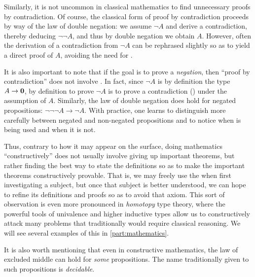 Similarly, it is not uncommon in classical mathematics to find unnecessary proofs by contradiction.
%
Of course, the classical form of proof by contradiction proceeds by way of the law of double negation: we assume $\neg A$ and derive a contradiction, thereby deducing $\neg \neg A$, and thus by double negation we obtain $A$.
However, often the derivation of a contradiction from $\neg A$ can be rephrased slightly so as to yield a direct proof of $A$, avoiding the need for \LEM{}.

It is also important to note that if the goal is to prove a \emph{negation}, then ``proof by contradiction'' does not involve \LEM{}.
In fact, since $\neg A$ is by definition the type $A\to\mathbf{0}$, by definition to prove $\neg A$ is to prove a contradiction (\emptyt) under the assumption of $A$.
Similarly, the law of double negation does hold for negated propositions: $\neg\neg\neg A \to \neg A$.
With practice, one learns to distinguish more carefully between negated and non-negated propositions and to notice when \LEM{} is being used and when it is not.

Thus, contrary to how it may appear on the surface, doing mathematics ``constructively'' does not usually involve giving up important theorems, but rather finding the best way to state the definitions so as to make the important theorems constructively provable.
That is, we may freely use the \LEM{} when first investigating a subject, but once that subject is better understood, we can hope to refine its definitions and proofs so as to avoid that axiom.
This sort of observation is even more pronounced in \emph{homotopy} type theory, where the powerful tools of univalence and higher inductive types allow us to constructively attack many problems that traditionally would require classical reasoning.
We will see several examples of this in \autoref{part:mathematics}.

It is also worth mentioning that even in constructive mathematics, the law of excluded middle can hold for \emph{some} propositions.
The name traditionally given to such propositions is \emph{decidable}.


